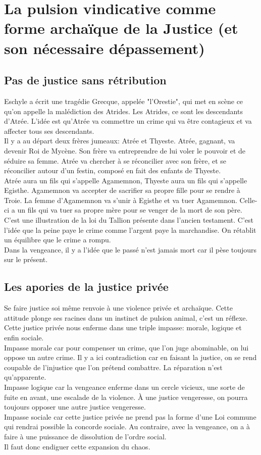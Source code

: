 \documentclass[10pt, a4paper, openany]{book}
\begin{document}
\section{La pulsion vindicative comme forme archaïque de la Justice (et son nécessaire dépassement)}

\subsection{Pas de justice sans rétribution}

Eschyle a écrit une tragédie Grecque, appelée "l'Orestie", qui met en scène ce qu'on appelle la malédiction des Atrides. Les Atrides, ce sont les descendants d'Atrée. L'idée est qu'Atrée va commettre un crime qui va être contagieux et va affecter tous ses descendants. \\
Il y a au départ deux frères jumeaux: Atrée et Thyeste. Atrée, gagnant, va devenir Roi de Mycène. Son frère va entreprendre de lui voler le pouvoir et de séduire sa femme. Atrée va chercher à se réconcilier avec son frère, et se réconcilier autour d'un festin, composé en fait des enfants de Thyeste. \\
Atrée aura un fils qui s'appelle Agamemnon, Thyeste aura un fils qui s'appelle Egisthe. Agamemnon va accepter de sacrifier sa propre fille pour se rendre à Troie. La femme d'Agamemnon va s'unir à Egisthe et va tuer Agamemnon. Celle-ci a un fils qui va tuer sa propre mère pour se venger de la mort de son père. \\
C'est une illustration de la loi du Tallion présente dans l'ancien testament. C'est l'idée que la peine paye le crime comme l'argent paye la marchandise. On rétablit un équilibre que le crime a rompu. \\
Dans la vengeance, il y a l'idée que le passé n'est jamais mort car il pèse toujours sur le présent. 


\subsection{Les apories de la justice privée}

Se faire justice soi même renvoie à une violence privée et archaïque. Cette attitude plonge ses racines dans un instinct de pulsion animal, c'est un réflexe. Cette justice privée nous enferme dans une triple impasse: morale, logique et enfin sociale. \\
Impasse morale car pour compenser un crime, que l'on juge abominable, on lui oppose un autre crime. Il y a ici contradiction car en faisant la justice, on se rend coupable de l'injustice que l'on prétend combattre. La réparation n'est qu'apparente. \\
Impasse logique car la vengeance enferme dans un cercle vicieux, une sorte de fuite en avant, une escalade de la violence. À une justice vengeresse, on pourra toujours opposer une autre justice vengeresse. \\
Impasse sociale car cette justice privée ne prend pas la forme d'une Loi commune qui rendrai possible la concorde sociale. Au contraire, avec la vengeance, on a à faire à une puissance de dissolution de l'ordre social. \\
Il faut donc endiguer cette expansion du chaos. 
\end{document}
